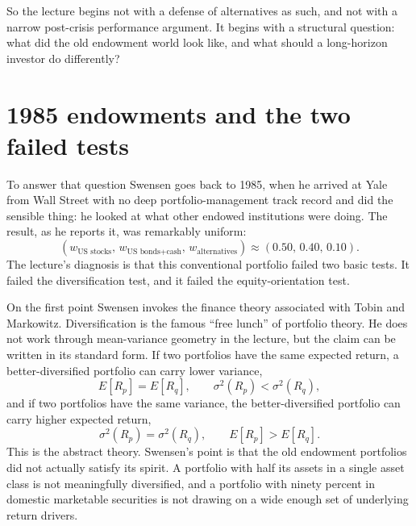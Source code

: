 So the lecture begins not with a defense of alternatives as such, and not with a narrow post-crisis performance argument. It begins with a structural question: what did the old endowment world look like, and what should a long-horizon investor do differently?

\section{1985 endowments and the two failed tests}

To answer that question Swensen goes back to 1985, when he arrived at Yale from Wall Street with no deep portfolio-management track record and did the sensible thing: he looked at what other endowed institutions were doing. The result, as he reports it, was remarkably uniform:
\begin{equation}
\left(w_{\text{US stocks}},\,w_{\text{US bonds+cash}},\,w_{\text{alternatives}}\right)
\approx (0.50,\,0.40,\,0.10).
\end{equation}
The lecture's diagnosis is that this conventional portfolio failed two basic tests. It failed the diversification test, and it failed the equity-orientation test.

On the first point Swensen invokes the finance theory associated with Tobin and Markowitz. Diversification is the famous ``free lunch'' of portfolio theory. He does not work through mean-variance geometry in the lecture, but the claim can be written in its standard form. If two portfolios have the same expected return, a better-diversified portfolio can carry lower variance,
\begin{equation}
E[R_p]=E[R_q], \qquad \sigma^2(R_p)<\sigma^2(R_q),
\end{equation}
and if two portfolios have the same variance, the better-diversified portfolio can carry higher expected return,
\begin{equation}
\sigma^2(R_p)=\sigma^2(R_q), \qquad E[R_p]>E[R_q].
\end{equation}
This is the abstract theory. Swensen's point is that the old endowment portfolios did not actually satisfy its spirit. A portfolio with half its assets in a single asset class is not meaningfully diversified, and a portfolio with ninety percent in domestic marketable securities is not drawing on a wide enough set of underlying return drivers.

